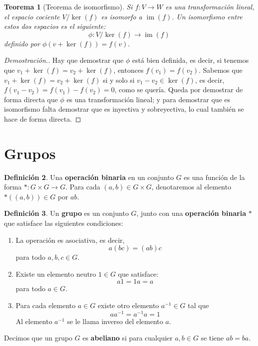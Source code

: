 \documentclass[12pt]{book}
\newtheorem{theorem}{Teorema}[section]
\theoremstyle{definition}
\newtheorem{definition}[theorem]{Definición}
\DeclareMathOperator{\im}{im}
\newcounter{in}
\newcounter{ini}
\begin{document}
\begin{theorem}[Teorema de isomorfismo]
  \label{teorema-isomorfismo-esp}
  Si $f:V\rightarrow W$ es una transformación lineal, el espacio
  cociente $V/\ker(f)$ es isomorfo a $\im(f)$. Un isomorfismo entre estos dos
  espacios es el siguiente:
  $$\phi:V/\ker(f)\rightarrow \im(f)$$
  definido por $\phi(v+\ker(f))=f(v).$
\end{theorem}
\begin{proof}[Demostración.]
  Hay que demostrar que $\phi$ está bien definida, es decir, si
  tenemos que
  $v_1+\ker(f)=v_2+\ker(f)$, entonces
  $f(v_1)=f(v_{2}).$ Sabemos que 
  $v_1+\ker(f)=v_2+\ker(f)$ si y solo si
  $v_{1}-v_{2}\in \ker(f)$, es decir,~$f(v_{1}-v_{2})=f(v_1)-f(v_2)=0$,
  como se quería. Queda por demostrar de forma directa que $\phi$ es
  una transformación lineal; y para demostrar que es isomorfismo falta
  demostrar que es inyectiva y sobreyectiva, lo cual también se hace
  de forma directa.
\end{proof}

\section{Grupos}
\label{grupos}

\begin{definition}
  Una \textbf{operación binaria} en un conjunto $G$ es una función
  de la forma $*:G  \times G \rightarrow G$. Para cada $(a,b)\in G
  \times G$, denotaremos al elemento~$*((a,b))\in G$ por $ab$. 
\end{definition} 

\begin{definition} 
  Un \textbf{grupo} es un conjunto $G$, junto con una
  \textbf{operación binaria} $*$ que satisface las siguientes condiciones:
    \begin{enumerate}
    \item La operación es asociativa, es decir, $$a(bc)=(ab)c$$ para todo $a,b,c \in G$.
    \item Existe un elemento neutro $1 \in G$ que
      satisface: $$a1=1a=a$$ para todo $a \in G$.
    \item Para cada elemento $a \in G$ existe otro elemento $a^{-1} \in G$
      tal que $$aa^{-1}=a^{-1}a=1$$ Al elemento $a^{-1}$ se le llama inverso del elemento $a$.
    \end{enumerate}

    Decimos que un grupo $G$ es \textbf{abeliano} si para cualquier
    $a,b\in G$ se tiene $ab=ba$.
\end{definition}
\end{document}
